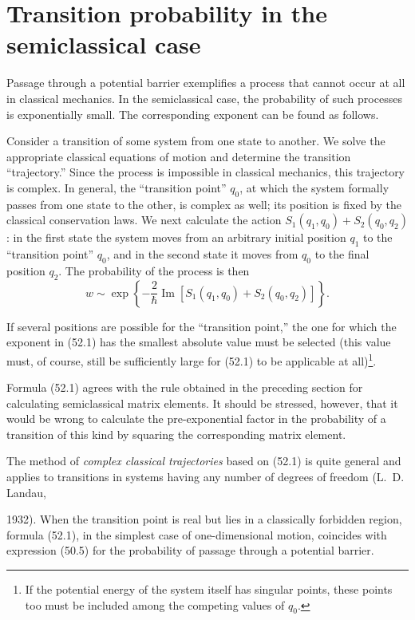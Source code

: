 \section{Transition probability in the semiclassical case}

Passage through a potential barrier exemplifies a process that cannot occur at
all in classical mechanics. In the semiclassical case, the probability of such
processes is exponentially small. The corresponding exponent can be found as
follows.

Consider a transition of some system from one state to another. We solve the
appropriate classical equations of motion and determine the transition
``trajectory.'' Since the process is impossible in classical mechanics, this
trajectory is complex. In general, the ``transition point'' $q_0$, at which the
system formally passes from one state to the other, is complex as well; its
position is fixed by the classical conservation laws. We next calculate the
action $S_1(q_1,q_0)+S_2(q_0,q_2)$: in the first state the system moves from an
arbitrary initial position $q_1$ to the ``transition point'' $q_0$, and in the
second state it moves from $q_0$ to the final position $q_2$. The probability
of the process is then
\begin{equation}
 w\sim\exp\left\{-\frac2\hbar\operatorname{Im}
 [S_1(q_1,q_0)+S_2(q_0,q_2)]\right\}.
 \tag{52.1}
\end{equation}

If several positions are possible for the ``transition point,'' the one for
which the exponent in (52.1) has the smallest absolute value must be selected
(this value must, of course, still be sufficiently large for (52.1) to be
applicable at all)\footnote{If the potential energy of the system itself has
singular points, these points too must be included among the competing values
of $q_0$.}.

Formula (52.1) agrees with the rule obtained in the preceding section for
calculating semiclassical matrix elements. It should be stressed, however,
that it would be wrong to calculate the pre-exponential factor in the
probability of a transition of this kind by squaring the corresponding matrix
element.

The method of \emph{complex classical trajectories} based on (52.1) is quite
general and applies to transitions in systems having any number of degrees of
freedom (L.~D. Landau,

1932). When the transition point is real but lies in a classically forbidden
region, formula (52.1), in the simplest case of one-dimensional motion,
coincides with expression (50.5) for the probability of passage through a
potential barrier.

